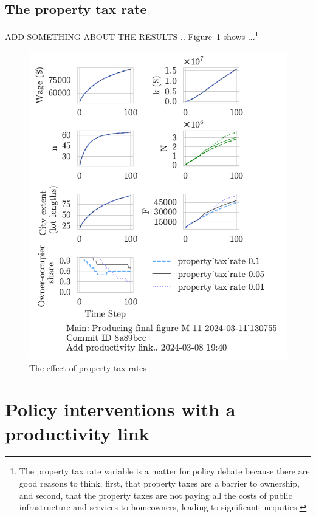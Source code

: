 \newpage
\subsection{The property tax rate}
{\color{red} ADD SOMETHING ABOUT THE RESULTS .. Figure~\ref{fig:property_tax_ownership_trajectory} shows ...}\footnote{The property tax rate variable is a matter for policy debate because there are good reasons to think, first, that property taxes are a barrier to ownership, and second, that the property taxes are not paying all the costs of public infrastructure and services to homeowners, leading to significant inequities.}

\begin{figure}[h!tb]
    \centering
    \includegraphics[scale=1.1, trim={0 1.4cm 0 0},clip]{fig/property_tax_rate-Main-130755.pdf}
    \caption{The effect of property tax rates}
    \label{fig:property_tax_ownership_trajectory}
\end{figure}




\newpage
\section{Policy interventions with a productivity link}


